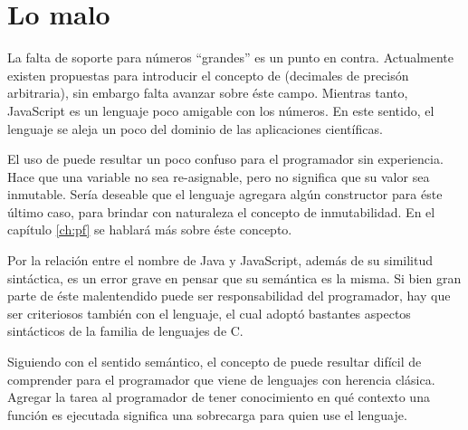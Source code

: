 \section{Lo malo}

La falta de soporte para números "`grandes"' es un punto en contra. Actualmente existen propuestas para introducir el concepto de  (decimales de precisón arbitraria), sin embargo falta avanzar sobre éste campo. Mientras tanto, JavaScript es un lenguaje poco amigable con los números. En este sentido, el lenguaje se aleja un poco del dominio de las aplicaciones científicas.

El uso de  puede resultar un poco confuso para el programador sin experiencia. Hace que una variable no sea re-asignable, pero no significa que su valor sea inmutable. Sería deseable que el lenguaje agregara algún constructor para éste último caso, para brindar con naturaleza el concepto de inmutabilidad. En el capítulo \ref{ch:pf} se hablará más sobre éste concepto.

Por la relación entre el nombre de Java y JavaScript, además de su similitud sintáctica, es un error grave en pensar que su semántica es la misma. Si bien gran parte de éste malentendido puede ser responsabilidad del programador, hay que ser criteriosos también con el lenguaje, el cual adoptó bastantes aspectos sintácticos de la familia de lenguajes de C.

Siguiendo con el sentido semántico, el concepto de  puede resultar difícil de comprender para el programador que viene de lenguajes con herencia clásica. Agregar la tarea al programador de tener conocimiento en qué contexto una función es ejecutada significa una sobrecarga para quien use el lenguaje.